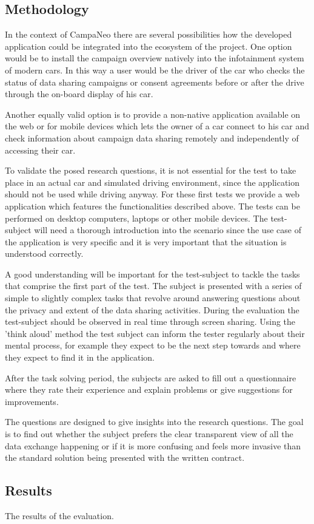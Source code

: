 
  \subsection{Methodology}
  In the context of CampaNeo there are several possibilities how the developed application could be integrated into the ecosystem of the project. One option would be to install the campaign overview natively into the infotainment system of modern cars. In this way a user would be the driver of the car who checks the status of data sharing campaigns or consent agreements before or after the drive through the on-board display of his car.
  
  Another equally valid option is to provide a non-native application available on the web or for mobile devices which lets the owner of a car connect to his car and check information about campaign data sharing remotely and independently of accessing their car.
  
  To validate the posed research questions, it is not essential for the test to take place in an actual car and simulated driving environment, since the application should not be used while driving anyway. For these first tests we provide a web application which features the functionalities described above. The tests can be performed on desktop computers, laptops or other mobile devices. The test-subject will need a thorough introduction into the scenario since the use case of the application is very specific and it is very important that the situation is understood correctly.
  
  A good understanding will be important for the test-subject to tackle the tasks that comprise the first part of the test. The subject is presented with a series of simple to slightly complex tasks that revolve around answering questions about the privacy and extent of the data sharing activities.
  During the evaluation the test-subject should be observed in real time through screen sharing. Using the 'think aloud' method the test subject can inform the tester regularly about their mental process, for example they expect to be the next step towards and where they expect to find it in the application.
  
  After the task solving period, the subjects are asked to fill out a questionnaire where they rate their experience and explain problems or give suggestions for improvements.
  
  The questions are designed to give insights into the research questions. The goal is to find out whether the subject prefers the clear transparent view of all the data exchange happening or if it is more confusing and feels more invasive than the standard solution being presented with the written contract.
  
  \subsection{Results}
  The results of the evaluation.
